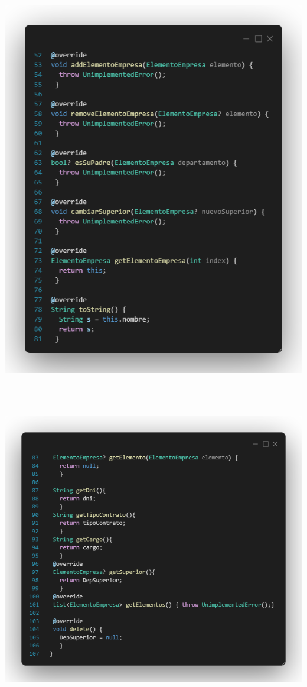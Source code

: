 \documentclass[
]{article}
\begin{document}
\includegraphics[width=5.90522in,height=7.30556in]{imagenes/Empleado2.png}
\pagebreak
\includegraphics[width=5.90522in,height=5.27778in]{imagenes/Empleado3.png}
\end{document}
